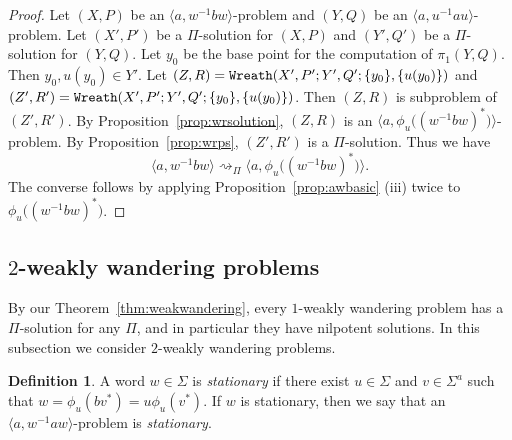 \documentclass[10pt,a4paper]{amsart}
\theoremstyle{definition}
\newtheorem{definition}[theorem]{Definition}
\theoremstyle{definition}
\numberwithin{equation}{section}
\begin{document}
\begin{proof} Let $(X, P)$ be an $\langle a, w^{-1}bw\rangle$-problem and $(Y, Q)$ be an $\langle a, u^{-1}au\rangle$-problem. Let $(X', P')$ be a $\Pi$-solution for $(X, P)$ and $(Y', Q')$ be a $\Pi$-solution for $(Y, Q)$. Let $y_0$ be the base point for the computation of $\pi_1(Y, Q)$. Then $y_0, u(y_0)\in Y'$. Let $(Z, R)=\mbox{\tt Wreath}(X', P'; Y', Q'; \{y_0\}, \{u(y_0)\})$ and $(Z', R')=\mbox{\tt Wreath}(X', P'; Y', Q'; \{y_0\}, \{u(y_0)\})$. Then $(Z, R)$ is subproblem of $(Z', R')$. By Proposition~\ref{prop:wrsolution}, $(Z, R)$ is an $\big\langle a, \phi_u\big((w^{-1}bw)^*\big)\big\rangle$-problem. By Proposition~\ref{prop:wrps}, $(Z', R')$ is a $\Pi$-solution. Thus we have
$$ \langle a, w^{-1}bw\rangle \rightsquigarrow_{\Pi} \big\langle a, \phi_u\big((w^{-1}bw)^*\big)\big\rangle.$$
The converse follows by applying Proposition~\ref{prop:awbasic} (iii) twice to $\phi_u\big((w^{-1}bw)^*\big)$.
\end{proof}










































\subsection{$2$-weakly wandering problems\label{subsec:2ww}}

By our Theorem~\ref{thm:weakwandering}, every $1$-weakly wandering problem has a $\Pi$-solution for any $\Pi$, and in particular they have nilpotent solutions. In this subsection we consider $2$-weakly wandering problems. 

\begin{definition} A word $w\in \Sigma$ is {\em stationary} if there exist $u\in \Sigma$ and $v\in \Sigma^a$ such that $w=\phi_u(bv^*)=u\phi_u(v^*)$. If $w$ is stationary, then we say that an $\langle a, w^{-1}aw\rangle$-problem is {\em stationary}.
\end{definition}
\end{document}
